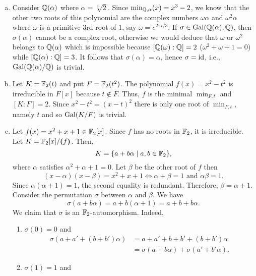 \begin{xmpls}\label{xmpls:minimal}${}$
    \begin{enumerate}[a), font=\upshape]
        \item Consider $\mathbb{Q}(\alpha)$ where $\alpha=\sqrt[3]2$. Since $\min_{\mathbb{Q},\alpha}(x)=x^3-2$, we know that the other two roots of this polynomial are the complex numbers $\omega\alpha$ and $\omega^2\alpha$ where $\omega$ is a primitive $3$rd root of $1$, say $\omega=e^{2\pi i/3}$. If $\sigma\in\operatorname{Gal}(\mathbb{Q}(\alpha),\mathbb{Q})$, then $\sigma(\alpha)$ cannot be a complex root, otherwise we would deduce that $\omega$ or $\omega^2$ belongs to $\mathbb{Q}(\alpha)$ which is impossible because $[\mathbb{Q}(\omega):\mathbb{Q}]=2$ ($\omega^2+\omega+1=0$) while $[\mathbb{Q}(\alpha):\mathbb{Q}]=3$. It follows that $\sigma(\alpha)=\alpha$, hence $\sigma=\operatorname{id}$, i.e., $\operatorname{Gal}(\mathbb{Q}(\alpha)/\mathbb{Q})$ is trivial.

        \item Let $K=\mathbb F_2(t)$ and put $F=\mathbb F_2(t^2)$. The polynomial $f(x)=x^2-t^2$ is irreducible in $F[x]$ because $t\notin F$. Thus, $f$ is the minimal $\min_{F,t}$ and $[K:F]=2$. Since $x^2-t^2=(x-t)^2$ there is only one root of $\min_{F,t}$, namely $t$ and so $\operatorname{Gal}(K/F)$ is trivial.

        \item Let $f(x) = x^2+x+1\in\mathbb F_2[x]$. Since $f$ has no roots in $\mathbb F_2$, it is irreducible. Let $K=\mathbb F_2[x]/\textrm{\boldmath$($}\!\,f\,\!\textrm{\boldmath$)$}$. Then,
        $$
            K=\{a+b\alpha\mid a,b\in\mathbb F_2\},
        $$
        where $\alpha$ satisfies $\alpha^2+\alpha+1=0$. Let $\beta$ be the other root of $f$ then
        $$
            (x-\alpha)(x-\beta) = x^2+x+1\iff \alpha+\beta=1
                \text{ and }\alpha\beta=1.
        $$
        Since $\alpha(\alpha+1)=1$, the second equality is redundant. Therefore, $\beta=\alpha+1$. Consider the permutation $\sigma$ between $\alpha$ and $\beta$. We have
        $$
            \sigma(a+b\alpha)=a+b(\alpha+1)=a+b+b\alpha.
        $$
        We claim that $\sigma$ is an $\mathbb F_2$-automorphism. Indeed,
        \begin{enumerate}[-]
            \item $\sigma(0)=0$ and
            \begin{align*}
                \sigma(a+a'+(b+b')\alpha) &= a+a'+b+b'+(b+b')\alpha\\
                    &=\sigma(a+b\alpha)+\sigma(a'+b'\alpha).
            \end{align*}

            \item $\sigma(1)=1$ and


\end{enumerate}
\end{enumerate}
\end{xmpls}
